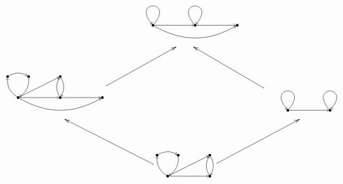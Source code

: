 \documentclass[12pt,times,a4paper]{amsart}
\numberwithin{equation}{section}
\numberwithin{equation}{section}
\begin{document}
\begin{equation}
\begin{gathered}
\xymatrix{
&
\begin{tikzpicture}[scale=0.4,auto,swap]
\centering
\tikzstyle{vertex}=[circle,fill=black,minimum size=3pt,inner sep=0pt]
\tikzstyle{edge}=[draw,->]
\tikzset{every loop/.style={min distance=20mm,in=130,out=50,looseness=40}}
    \node[vertex] (1) at (-4,0) {};
    \node[vertex] (2) at (0,0) {};
    \node[vertex] (3) at (4,0) {};
    \path (1) edge [edge, anchor=center, loop above] node {} (1);
    \path (2) edge [draw,<-, anchor=center, loop above] node {} (2);
    \path (1) edge [edge] node {} (2);
    \path (1) edge [edge, bend right] node {} (3);
    \path (2) edge [edge] node {} (3);
\end{tikzpicture}
&\\
\begin{tikzpicture}[scale=0.4,auto,swap]
\centering
\tikzstyle{vertex}=[circle,fill=black,minimum size=3pt,inner sep=0pt]
\tikzstyle{edge}=[draw,->]
    \node[vertex] (1) at (-2,0) {};
    \node[vertex] (2) at (2,0) {};
    \node[vertex] (11) at (-3,2) {};
    \node[vertex] (12) at (-1,2) {};
    \node[vertex] (21) at (2,2) {};
    \node[vertex] (3) at (6,0) {};
    \path (1) edge [edge,bend left] node {} (11);
    \path (11) edge [edge, bend left] node {} (12);
    \path (12) edge [edge, bend left] node {} (1);
    \path (1) edge [edge] node {} (2);
    \path (1) edge [edge] node {} (21);
    \path (2) edge [edge, bend left] node {} (21);
    \path (21) edge [edge, bend left] node {} (2);
    \path (2) edge [edge] node {} (3);
    \path (1) edge [edge, bend right] node {} (3);
\end{tikzpicture}
\ar[ur]& & 
\begin{tikzpicture}[scale=0.4,auto,swap]
\centering
\tikzstyle{vertex}=[circle,fill=black,minimum size=3pt,inner sep=0pt]
\tikzstyle{edge}=[draw,->]
\tikzset{every loop/.style={min distance=20mm,in=130,out=50,looseness=40}}
    \node[vertex] (1) at (-2,0) {};
    \node[vertex] (2) at (2,0) {};
    \path (1) edge [edge, anchor=center, loop above] node {} (1);
    \path (2) edge [draw,<-, anchor=center, loop above] node {} (2);
    \path (1) edge [edge] node {} (2);
\end{tikzpicture}
\ar[ul]\\
&
\begin{tikzpicture}[scale=0.4,auto,swap]
\centering
\tikzstyle{vertex}=[circle,fill=black,minimum size=3pt,inner sep=0pt]
\tikzstyle{edge}=[draw,->]
    \node[vertex] (1) at (-2,0) {};
    \node[vertex] (2) at (2,0) {};
    \node[vertex] (11) at (-3,2) {};
    \node[vertex] (12) at (-1,2) {};
    \node[vertex] (21) at (2,2) {};
    \path (1) edge [edge,bend left] node {} (11);
    \path (11) edge [edge, bend left] node {} (12);
    \path (12) edge [edge, bend left] node {} (1);
    \path (1) edge [edge] node {} (2);
    \path (1) edge [edge] node {} (21);
    \path (2) edge [edge, bend left] node {} (21);
    \path (21) edge [edge, bend left] node {} (2);
\end{tikzpicture}
\ar[ur]\ar[ul]&
}
\end{gathered}
\end{equation}
\end{document}
